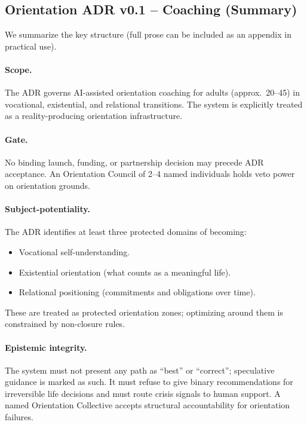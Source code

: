 \documentclass[11pt]{article}
\begin{document}
\subsection{Orientation ADR v0.1 -- Coaching (Summary)}

We summarize the key structure (full prose can be included as an appendix in practical use).

\paragraph{Scope.} The ADR governs AI-assisted orientation coaching for adults (approx.\ 20--45) in vocational, existential, and relational transitions. The system is explicitly treated as a reality-producing orientation infrastructure.

\paragraph{Gate.} No binding launch, funding, or partnership decision may precede ADR acceptance. An Orientation Council of 2--4 named individuals holds veto power on orientation grounds.

\paragraph{Subject-potentiality.} The ADR identifies at least three protected domains of becoming:

\begin{itemize}[nosep]
  \item Vocational self-understanding.
  \item Existential orientation (what counts as a meaningful life).
  \item Relational positioning (commitments and obligations over time).
\end{itemize}

These are treated as protected orientation zones; optimizing around them is constrained by non-closure rules.

\paragraph{Epistemic integrity.} The system must not present any path as ``best'' or ``correct''; speculative guidance is marked as such. It must refuse to give binary recommendations for irreversible life decisions and must route crisis signals to human support. A named Orientation Collective accepts structural accountability for orientation failures.
\end{document}
